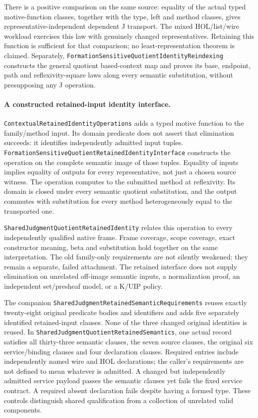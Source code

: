 \documentclass[11pt]{article}
\theoremstyle{definition}
\theoremstyle{remark}
\begin{document}
There is a positive comparison on the same source: equality of the actual
typed motive-function classes, together with the type, left and method
classes, gives representative-independent dependent J transport. The
mixed HOL/list/wire workload exercises this law with genuinely changed
representatives. Retaining this function is sufficient for that comparison;
no least-representation theorem is claimed.
Separately, \nolinkurl{FormationSensitiveQuotientIdentityReindexing}
constructs the general quotient based-context map and proves its base,
endpoint, path and reflexivity-square laws along every semantic
substitution, without presupposing any J operation.

\paragraph{A constructed retained-input identity interface.}
\nolinkurl{ContextualRetainedIdentityOperations} adds a typed motive
function to the family/method input. Its domain predicate does not assert
that elimination succeeds: it identifies independently admitted input
tuples. \nolinkurl{FormationSensitiveQuotientRetainedIdentityInterface}
constructs the operation on the complete semantic image of those tuples.
Equality of inputs implies equality of outputs for every representative,
not just a chosen source witness. The operation computes to the submitted
method at reflexivity. Its domain is closed under every semantic quotient
substitution, and the output commutes with substitution for every method
heterogeneously equal to the transported one.

\nolinkurl{SharedJudgmentQuotientRetainedIdentity} relates this operation
to every independently qualified native frame. Frame coverage, scope
coverage, exact constructor meaning, beta and substitution hold together
on the same interpretation. The old family-only requirements are not
silently weakened: they remain a separate, failed attachment. The retained
interface does not supply elimination on unrelated off-image semantic
inputs, a normalization proof, an independent set/presheaf model, or a
K/UIP policy.

The companion \nolinkurl{SharedJudgmentRetainedSemanticRequirements}
reuses exactly twenty-eight original predicate bodies and identifiers and
adds five separately identified retained-input clauses. None of the three
changed original identities is reused. In
\nolinkurl{SharedJudgmentQuotientRetainedSemantics}, one actual record
satisfies all thirty-three semantic clauses, the seven source clauses,
the original six service/binding clauses and four declaration clauses.
Required entries include independently named wire and HOL declarations;
the caller's requirements are not defined to mean whatever is admitted.
A changed but independently admitted service payload passes the semantic
clauses yet fails the fixed service contract. A required absent declaration
fails despite having a formed type. These controls distinguish shared
qualification from a collection of unrelated valid components.
\end{document}
